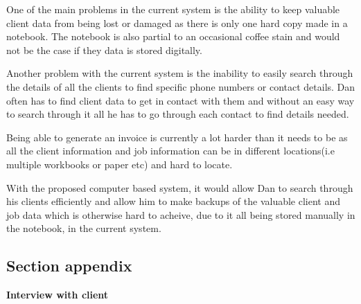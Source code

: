 	\begin{flushleft}
	
	One of the main problems in the current system is the ability to keep valuable client data from being lost or damaged as there is only one hard copy made in a notebook. The notebook is also partial to an occasional coffee stain and would not be the case if they data is stored digitally.\par


Another problem with the current system is the inability to easily search through the details of all the clients to find specific phone numbers or contact details. Dan often has to find client data to get in contact with them and without an easy way to search through it all he has to go through each contact to find details needed.\par

Being able to generate an invoice is currently a lot harder than it needs to be as all the client information and job information can be in different locations(i.e multiple workbooks or paper etc) and hard to locate.\par 

With the proposed computer based system, it would allow Dan to search through his clients efficiently and allow him to make backups of the valuable client and job data which is otherwise hard to acheive, due to it all being stored manually in the notebook, in the current system. \par 
		



	
	\end{flushleft}

		





\subsection{Section appendix}


\begin{flushleft}
	\textbf{Interview with client}
\end{flushleft}


